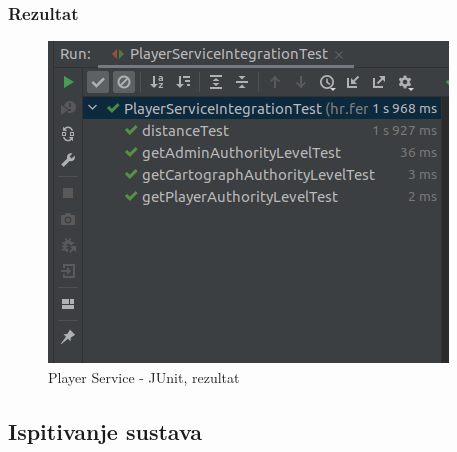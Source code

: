 			\subsubsection{Rezultat}
			
					\begin{figure}[H]
						\includegraphics[width=\textwidth]{slike/playerServiceTest_result} 
						\centering
						\caption{Player Service - JUnit, rezultat}
						\label{}
					\end{figure}
			
			
			\eject
			
			\subsection{Ispitivanje sustava}
			
			 
			
